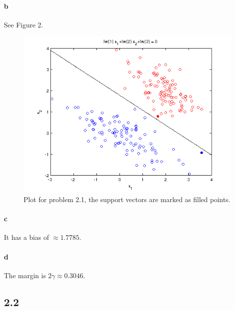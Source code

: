 \documentclass{article}
\begin{document}
\paragraph{b}
See Figure 2.
\begin{figure}
\begin{center}
\includegraphics[scale = 0.6]{pics/plot21.png}
\caption{Plot for problem 2.1, the support vectors are marked as filled points.}
\end{center}
\end{figure}
\paragraph{c}
It has a bias of $\approx 1.7785$.

\paragraph{d}
The margin is $2\gamma \approx 0.3046$.

\subsection*{2.2}
\end{document}
